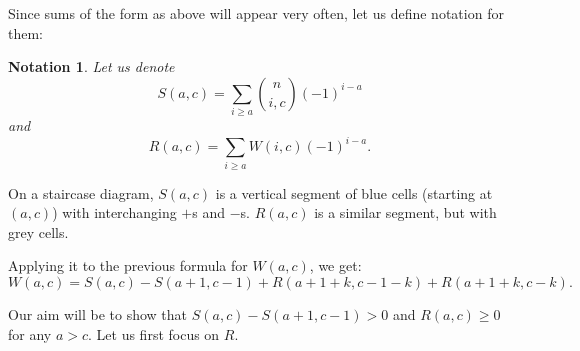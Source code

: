 \documentclass[11pt, reqno]{amsart}
\newtheorem*{notation}{Notation}
\numberwithin{equation}{section}
\begin{document}
Since sums of the form as above will appear very often, let us define notation for them:

\begin{notation}
    Let us denote
    \begin{equation*}
        S(a, c) = \sum_{i \geqslant a} \binom{n}{i, c} (-1)^{i-a}
    \end{equation*}
    and
    \begin{equation*}
        R(a, c) = \sum_{i \geqslant a} W(i, c) (-1)^{i-a}.
    \end{equation*}
\end{notation}

On a staircase diagram, $S(a, c)$ is a vertical segment of blue cells (starting at $(a, c)$) with interchanging $+$s and $-$s. $R(a, c)$ is a similar segment, but with grey cells.

Applying it to the previous formula for $W(a, c)$, we get:
\begin{equation}
\label{eq_step_1}
    W(a, c) = S(a, c) - S(a+1, c-1) + R(a+1+k, c-1-k) + R(a+1+k, c-k).
\end{equation}

Our aim will be to show that $S(a, c) - S(a+1, c-1)>0$ and $R(a, c) \geqslant 0$ for any $a>c$. Let us first focus on $R$.
\end{document}
